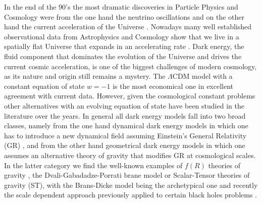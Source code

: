 In the end of the 90's the most dramatic discoveries in Particle Physics and Cosmology were from the one hand the neutrino oscillations and on the other hand the current acceleration of the Universe \cite{SN1,SN2}. Nowadays many well established observational data from Astrophysics and Cosmology show that we live in a spatially flat Universe that expands in an accelerating rate \cite{turner}. Dark energy, the fluid component that dominates the evolution of the Universe and drives the current cosmic acceleration, is one of the biggest challenges of modern cosmology, as its nature and origin still remains a mystery. The $\Lambda$CDM model with a constant equation of state $w=-1$ is the most economical one in excellent agreement with current data. However, given the cosmological constant problems other alternatives with an evolving equation of state have been studied in the literature over the years. In general all
dark energy models fall into two broad classes, namely from the one hand dynamical dark energy models in which one has to introduce a new dynamical field assuming Einstein's General Relativity (GR) \cite{quint,mukhanov,tachyon,chapl}, and from the other hand geometrical dark energy models in which one assumes an alternative theory of gravity that modifies GR at cosmological scales. In the latter category we find the well-known examples of $f(R)$
theories of gravity \cite{Sotiriou:2008rp,DeFelice:2010aj,Nojiri:2017ncd,Nojiri:2010wj}, the Dvali-Gabadadze-Porrati brane model \cite{dgp} or Scalar-Tensor theories of gravity (ST), with the Brans-Dicke \cite{BD} model being the archetypical one and recently the scale dependent approach previously applied to certain black holes problems \cite{Koch:2016uso,Rincon:2017ypd,Rincon:2017goj,Rincon:2017ayr,Contreras:2017eza}.

